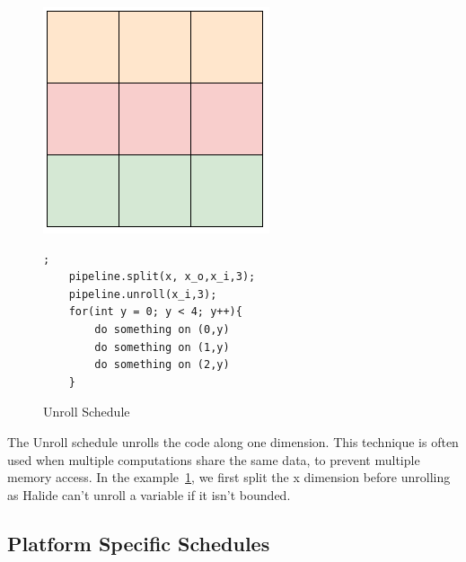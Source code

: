 \begin{figure}[H]
		\begin{minipage}[c]{\EIW}
			\centering
		\includegraphics[width=\textwidth]{Images/Unroll.png}
		\end{minipage}
		\begin{minipage}[c]{\ECW}
			\centering
			\begin{lstlisting}[label={code:reorder}];
	pipeline.split(x, x_o,x_i,3);
	pipeline.unroll(x_i,3);
	for(int y = 0; y < 4; y++){
		do something on (0,y)
		do something on (1,y)
		do something on (2,y)
	}

\end{lstlisting}
		\end{minipage}
	\caption{Unroll Schedule}
	\label{schedule:unroll}
\end{figure}
	The Unroll schedule unrolls the code along one dimension. This technique is often used when multiple computations share the same data, to prevent multiple memory access. In the example~\ref{schedule:unroll}, we first  split the x dimension before unrolling as Halide can't unroll a variable if it isn't bounded.


	\subsection{Platform Specific Schedules}

